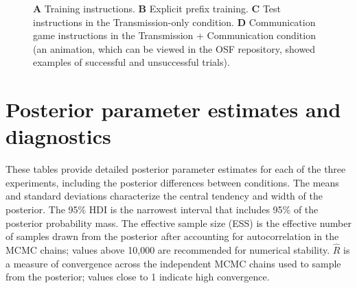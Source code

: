 \documentclass[doc,biblatex]{apa7}
\begin{document}
\begin{figure}[h!]
\vspace*{2pt}
\caption{\textbf{A} Training instructions. \textbf{B} Explicit prefix training. \textbf{C} Test instructions in the Transmission-only condition. \textbf{D} Communication game instructions in the Transmission + Communication condition (an animation, which can be viewed in the OSF repository, showed examples of successful and unsuccessful trials).}
\label{supp_training}
\end{figure}

\clearpage

\section{Posterior parameter estimates and diagnostics}

These tables provide detailed posterior parameter estimates for each of the three experiments, including the posterior differences between conditions. The means and standard deviations characterize the central tendency and width of the posterior. The 95\% HDI is the narrowest interval that includes 95\% of the posterior probability mass. The effective sample size (ESS) is the effective number of samples drawn from the posterior after accounting for autocorrelation in the MCMC chains; values above 10,000 are recommended for numerical stability. $\hat{R}$ is a measure of convergence across the independent MCMC chains used to sample from the posterior; values close to 1 indicate high convergence.
\end{document}
